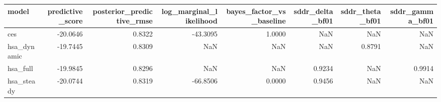 \begin{tabular}{lrrrrrrr}
\toprule
model & predictive\_score & posterior\_predictive\_rmse & log\_marginal\_likelihood & bayes\_factor\_vs\_baseline & sddr\_delta\_bf01 & sddr\_theta\_bf01 & sddr\_gamma\_bf01 \\
\midrule
ces & -20.0646 & 0.8322 & -43.3095 & 1.0000 & NaN & NaN & NaN \\
hsa\_dynamic & -19.7445 & 0.8309 & NaN & NaN & NaN & 0.8791 & NaN \\
hsa\_full & -19.9845 & 0.8296 & NaN & NaN & 0.9234 & NaN & 0.9914 \\
hsa\_steady & -20.0744 & 0.8319 & -66.8506 & 0.0000 & 0.9456 & NaN & NaN \\
\bottomrule
\end{tabular}
